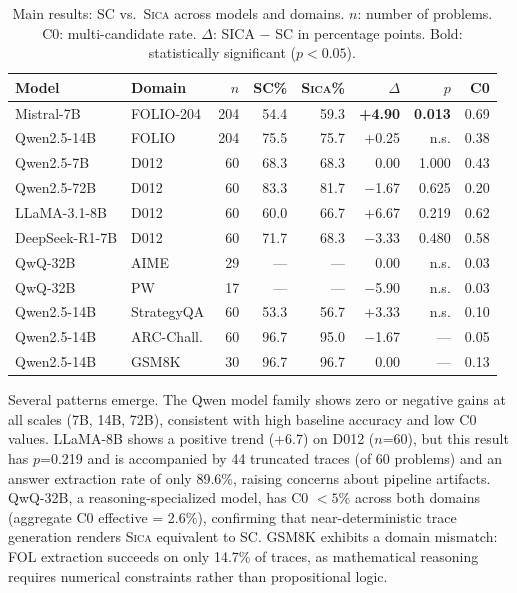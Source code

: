 \documentclass[11pt,a4paper]{article}
\newcommand{\sica}{\textsc{Sica}}
\newcommand{\pp}{\text{pp}}
\begin{document}
\begin{table}[t]
\centering
\caption{Main results: SC vs.\ \sica{} across models and domains. $n$: number of problems. C0: multi-candidate rate. $\Delta$: SICA $-$ SC in percentage points. Bold: statistically significant ($p < 0.05$).}
\label{tab:main}
\small
\begin{tabular}{llrrrrrr}
\toprule
Model & Domain & $n$ & SC\% & \sica{}\% & $\Delta$\pp{} & $p$ & C0 \\
\midrule
Mistral-7B & FOLIO-204 & 204 & 54.4 & 59.3 & \textbf{+4.90} & \textbf{0.013} & 0.69 \\
Qwen2.5-14B & FOLIO & 204 & 75.5 & 75.7 & +0.25 & n.s. & 0.38 \\
Qwen2.5-7B & D012 & 60 & 68.3 & 68.3 & 0.00 & 1.000 & 0.43 \\
Qwen2.5-72B & D012 & 60 & 83.3 & 81.7 & $-$1.67 & 0.625 & 0.20 \\
LLaMA-3.1-8B & D012 & 60 & 60.0 & 66.7 & +6.67 & 0.219 & 0.62 \\
DeepSeek-R1-7B & D012 & 60 & 71.7 & 68.3 & $-$3.33 & 0.480 & 0.58 \\
QwQ-32B & AIME & 29 & --- & --- & 0.00 & n.s. & 0.03 \\
QwQ-32B & PW & 17 & --- & --- & $-$5.90 & n.s. & 0.03 \\
\midrule
Qwen2.5-14B & StrategyQA & 60 & 53.3 & 56.7 & +3.33 & n.s. & 0.10 \\
Qwen2.5-14B & ARC-Chall. & 60 & 96.7 & 95.0 & $-$1.67 & --- & 0.05 \\
Qwen2.5-14B & GSM8K & 30 & 96.7 & 96.7 & 0.00 & --- & 0.13 \\
\bottomrule
\end{tabular}
\end{table}

Several patterns emerge.
The Qwen model family shows zero or negative gains at all scales (7B, 14B, 72B), consistent with high baseline accuracy and low C0 values.
LLaMA-8B shows a positive trend (+6.7\pp{}) on D012 ($n$=60), but this result has $p$=0.219 and is accompanied by 44 truncated traces (of 60 problems) and an answer extraction rate of only 89.6\%, raising concerns about pipeline artifacts.
QwQ-32B, a reasoning-specialized model, has C0 $< 5\%$ across both domains (aggregate C0 effective = 2.6\%), confirming that near-deterministic trace generation renders \sica{} equivalent to SC.
GSM8K exhibits a domain mismatch: FOL extraction succeeds on only 14.7\% of traces, as mathematical reasoning requires numerical constraints rather than propositional logic.
\end{document}
